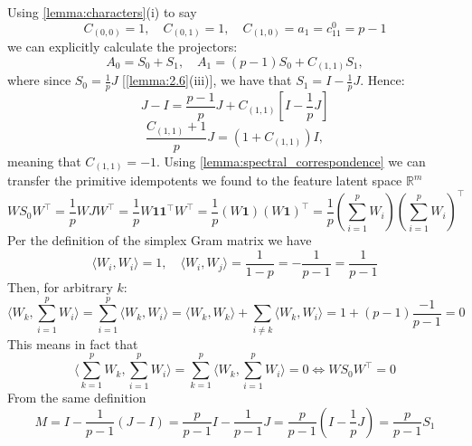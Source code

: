 \documentclass{article}
\theoremstyle{plain}
\numberwithin{equation}{section}
\theoremstyle{definition}
\theoremstyle{remark}
\begin{document}
Using \ref{lemma:characters}(i) to say $$C_{(0,0)}=1,\quad C_{(0, 1)}=1, \quad C_{(1,0)}= a_1=c_{11}^0=p-1$$
we can explicitly calculate the projectors: $$A_0 = S_0 + S_1, \quad A_1 = (p-1)S_0 + C_{(1, 1)}S_1,$$
where since $S_0 = \frac{1}{p}J$ [\ref{lemma:2.6}(iii)], we have that $S_1 = I - \frac{1}{p}J$. Hence: $$J-I = \frac{p-1}{p}J +C_{(1,1)}\left[I-\frac{1}{p}J\right]$$
$$\frac{C_{(1,1)}+1}{p}J =(1+C_{(1,1)})I,$$ 
meaning that $C_{(1, 1)}=-1$. Using \ref{lemma:spectral_correspondence} we can transfer the primitive idempotents we found to the feature latent space $\mathbb{R}^m$
$$WS_0W^\top = \frac{1}{p}WJW^\top = \frac{1}{p}W\mathbf{1}\mathbf{1}^\top W^\top = \frac{1}{p}(W\mathbf{1})(W\mathbf{1})^\top = \frac{1}{p}\left(\sum_{i=1}^pW_i\right)\left(\sum_{i=1}^pW_i\right)^\top$$
Per the definition of the simplex Gram matrix we have $$\langle W_i, W_i\rangle = 1, \quad \langle W_i, W_j\rangle  = \frac{1}{1-p} = -\frac{1}{p-1} = \frac{1}{p-1}$$
Then, for arbitrary $k$: $$\langle W_k, \sum_{i=1}^pW_i\rangle  = \sum_{i=1}^p\langle W_k, W_i\rangle  = \langle W_k, W_k\rangle + \sum_{i\neq k} \langle W_k, W_i\rangle = 1 + (p-1)\frac{-1}{p-1}=0$$
This means in fact that $$\langle \sum_{k=1}^p W_k, \sum_{i=1}^pW_i\rangle = \sum_{k=1}^p\langle W_k, \sum_{i=1}^pW_i\rangle = 0\Leftrightarrow WS_0W^\top = 0$$
From the same definition $$M = I - \frac{1}{p-1}(J-I) = \frac{p}{p-1}I - \frac{1}{p-1}J = \frac{p}{p-1}\left(I-\frac{1}{p}J\right) = \frac{p}{p-1}S_1$$
\end{document}
